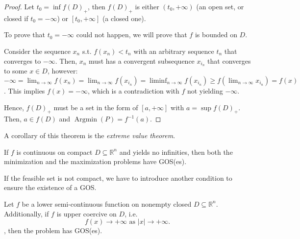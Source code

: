 \begin{proof}
Let \( t_{0} = \inf f(D)_{+} \), then \( f(D)_{+} \) is either \( (t_{0},
+\infty) \) (an open set, or closed if \( t_{0} = -\infty \)) or \( [t_{0},
+\infty] \) (a closed one).

To prove that \( t_{0} = -\infty \) could not happen, we will prove that \( f \)
is bounded on \( D \).

Consider the sequence \( x_{n} \) s.t. \( f(x_{n}) < t_{n} \) with an arbitrary
sequence \( t_{n} \) that converges to \( -\infty \). Then, \( x_{n} \) must
has a convergent subsequence \( x_{i_{n}} \) that converges to some \( x \in D \),
however: \( -\infty = \lim_{n \to
\infty} f(x_{n}) = \lim_{n \to \infty} f(x_{i_{n}}) = \liminf_{n \to \infty}
f(x_{i_{n}}) \ge f(\lim_{n \to \infty} x_{i_{n}}) = f(x) \). This implies \(
f(x) = -\infty \), which is a contradiction with \( f \) not yielding \( -\infty
\).

Hence, \( f(D)_{+} \) must be a set in the form of \( [a, +\infty] \) with \( a
= \sup f(D)_{+}\). Then, \( a \in f(D) \) and \( \operatorname{Argmin}(P)
= f^{-1}(a)\).
\end{proof}
A corollary of this theorem is the \textit{extreme value theorem}.

\begin{corollary}
  If \( f \) is continuous on compact \( D \subseteq \mathbb{R}^{n} \) and
  yields no infinities, then both the minimization and the maximization problems
  have GOS(es).
\end{corollary}

If the feasible set is not compact, we have to introduce another condition to
ensure the existence of a GOS.

\begin{theorem}
\label{thr:coercive condition}
  Let \( f \) be a lower semi-continuous function on nonempty closed
  \( D \subseteq \mathbb{R}^{n} \).
  Additionally, if \( f \) is upper coercive on \( D \), i.e.
  \[
    f(x) \to +\infty \text{ as } |x| \to  +\infty
  .\], then the problem has GOS(es).
\end{theorem}


